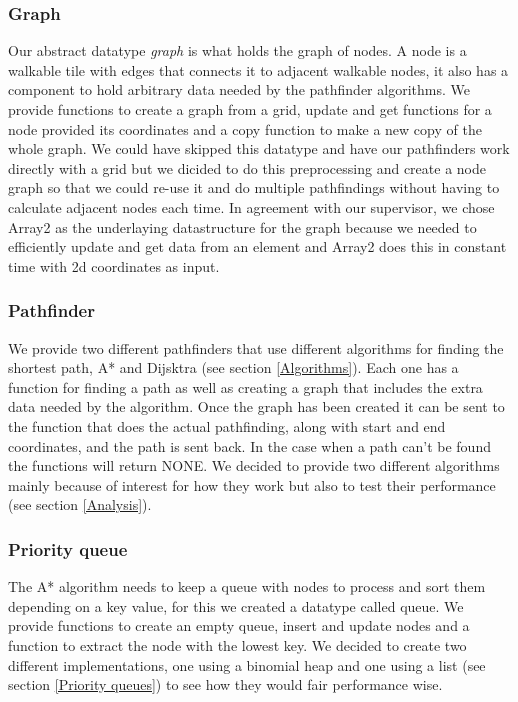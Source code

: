 \documentclass[12pt, a4paper]{article}
\begin{document}
\subsubsection{Graph}

Our abstract datatype \textit{graph} is what holds the graph of nodes. A
node is a walkable tile with edges that connects it to adjacent walkable
nodes, it also has a component to hold arbitrary data needed by the
pathfinder algorithms. We provide functions to create a graph from a grid,
update and get functions for a node provided its coordinates and a copy
function to make a new copy of the whole graph. We could have skipped this
datatype and have our pathfinders work directly with a grid but we dicided
to do this preprocessing and create a node graph so that we could re-use it
and do multiple pathfindings without having to calculate adjacent nodes
each time. In agreement with our supervisor, we chose Array2 as the
underlaying datastructure for the graph because we needed to efficiently
update and get data from an element and Array2 does this in constant time
with 2d coordinates as input.


\subsubsection{Pathfinder}

We provide two different pathfinders that use different algorithms for
finding the shortest path, A* and Dijsktra (see section \ref{Algorithms}).
Each one has a function for finding a path as well as creating a graph that
includes the extra data needed by the algorithm. Once the graph has been
created it can be sent to the function that does the actual pathfinding,
along with start and end coordinates, and the path is sent back. In the
case when a path can't be found the functions will return NONE. We decided
to provide two different algorithms mainly because of interest for how they
work but also to test their performance (see section \ref{Analysis}).


\subsubsection{Priority queue}

The A* algorithm needs to keep a queue with nodes to process and sort them
depending on a key value, for this we created a datatype called queue. We
provide functions to create an empty queue, insert and update nodes and a
function to extract the node with the lowest key. We decided to create two
different implementations, one using a binomial heap and one using a list
(see section \ref{Priority queues}) to see how they would fair performance
wise.
\end{document}
